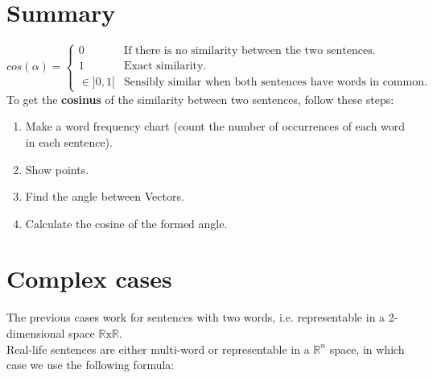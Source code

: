 \documentclass[a4paper, 14pt]{article}
\begin{document}
    \section{Summary}
	  \[
		cos(\alpha) =
		\begin{cases}
			0&\text{If there is no similarity between the two sentences.}\\
			1 & \text{Exact similarity.}\\
			\in ]0, 1[ & \text{Sensibly similar when both sentences have words in common.}
		\end{cases}
	  \]
		To get the  \textbf{cosinus} of the similarity between two sentences, follow these steps:
		\begin{enumerate}
			\item Make a word frequency chart (count the number of occurrences of each word in each sentence).
			\item Show points.
			\item Find the angle between Vectors.
			\item Calculate the cosine of the formed angle.
		\end{enumerate}

    \section{Complex cases}
    The previous cases work for sentences with two words, i.e. representable in a 2-dimensional space $\mathds{R} \text{x} \mathds{R}$. \\
    Real-life sentences are either multi-word or representable in a $\mathds{R}^{n}$ space, in which case we use the following formula:
\end{document}
